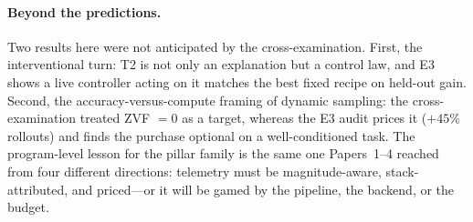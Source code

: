 \paragraph{Beyond the predictions.} Two results here were not anticipated
by the cross-examination. First, the interventional turn: T2 is not only an
explanation but a control law, and E3 shows a live controller acting on it
matches the best fixed recipe on held-out gain. Second, the
accuracy-versus-compute framing of dynamic sampling: the cross-examination
treated ZVF $= 0$ as a target, whereas the E3 audit prices it ($+45\%$
rollouts) and finds the purchase optional on a well-conditioned task. The
program-level lesson for the pillar family is the same one Papers~1--4
reached from four different directions: telemetry must be
magnitude-aware, stack-attributed, and priced---or it will be gamed by the
pipeline, the backend, or the budget.
